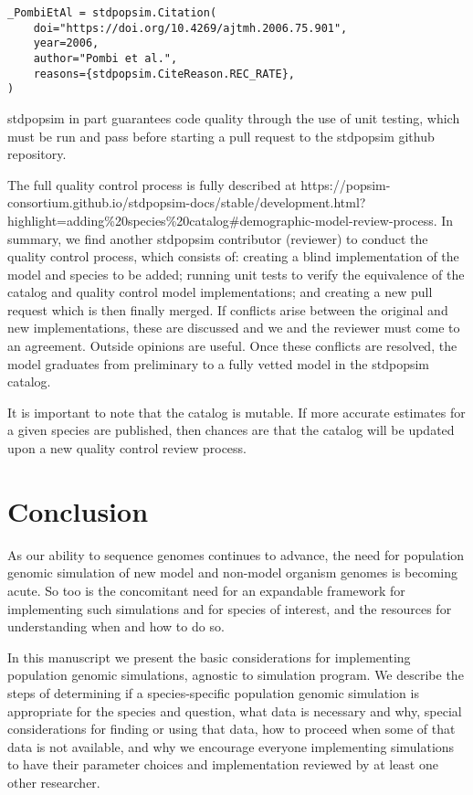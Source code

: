 \documentclass[hidelinks]{article}
\begin{document}
\begin{verbatim}
_PombiEtAl = stdpopsim.Citation(
    doi="https://doi.org/10.4269/ajtmh.2006.75.901",
    year=2006,
    author="Pombi et al.",
    reasons={stdpopsim.CiteReason.REC_RATE},
)
\end{verbatim}

stdpopsim in part guarantees code quality through the use of unit
testing, which must be run and pass before starting a pull request to
the stdpopsim github repository.

The full quality control process is fully described at
https://popsim-consortium.github.io/stdpopsim-docs/stable/development.html?highlight=adding\%20species\%20catalog\#demographic-model-review-process.
In summary, we find another stdpopsim contributor (reviewer) to conduct
the quality control process, which consists of: creating a blind
implementation of the model and species to be added; running unit tests
to verify the equivalence of the catalog and quality control model
implementations; and creating a new pull request which is then finally
merged. If conflicts arise between the original and new implementations,
these are discussed and we and the reviewer must come to an agreement.
Outside opinions are useful. Once these conflicts are resolved, the
model graduates from preliminary to a fully vetted model in the stdpopsim catalog.

It is important to note that the catalog is mutable. If more accurate
estimates for a given species are published, then chances are that the
catalog will be updated upon a new quality control review process.

\hypertarget{conclusion}{%
\section*{Conclusion}\label{conclusion}}

As our ability to sequence genomes continues to advance, the need for
population genomic simulation of new model and non-model organism genomes is
becoming acute. So too is the concomitant need for an expandable framework
for implementing such simulations and for species of interest, and
the resources for understanding when and how to do so.

In this manuscript we present the basic considerations for implementing
population genomic simulations, agnostic to simulation program. We
describe the steps of determining if a species-specific population
genomic simulation is appropriate for the species and question, what
data is necessary and why, special considerations for finding or using
that data, how to proceed when some of that data is not available,
and why we encourage everyone implementing simulations to have their
parameter choices and implementation reviewed by at least one other
researcher.
\end{document}
